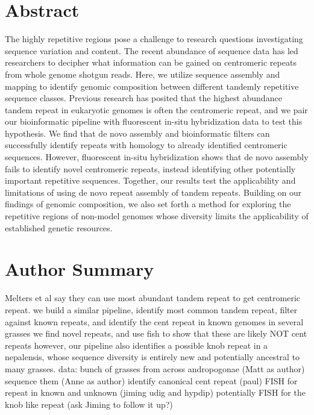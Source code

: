 \documentclass[10pt,letterpaper]{article}
\begin{document}
\section*{Abstract}
The highly repetitive regions pose a challenge to research questions investigating sequence variation and content.
The recent abundance of sequence data has led researchers to decipher what information can be gained on centromeric repeats from whole genome shotgun reads.
Here, we utilize sequence assembly and mapping to identify genomic composition between different tandemly repetitive sequence classes.
Previous research has posited that the highest abundance tandem repeat in eukaryotic genomes is often the centromeric repeat, and we pair our bioinformatic pipeline with fluorescent in-situ hybridization data to test this hypothesis.
We find that de novo assembly and bioinformatic filters can successfully identify repeats with homology to already identified centromeric sequences.
However, fluorescent in-situ hybridization shows that de novo assembly fails to identify novel centromeric repeats, instead identifying other potentially important repetitive sequences.
Together, our results test the applicability and limitations of using de novo repeat assembly of tandem repeats.
Building on our findings of genomic composition, we also set forth a method for exploring the repetitive regions of non-model genomes whose diversity limits the applicability of established genetic resources.


\section*{Author Summary}
Melters et al say they can use most abundant tandem repeat to get centromeric repeat.
we build a similar pipeline, identify most common tandem repeat, filter against known repeats, and identify the cent repeat in known genomes
in several grasses we find novel repeats, and use fish to show that these are likely NOT cent repeats
however, our pipeline also identifies a possible knob repeat in a nepalensis, whose sequence diversity is entirely new and potentially ancestral to many grasses.
data: 
bunch of grasses from across andropogonae (Matt as author)
sequence them (Anne as author)
identify canonical cent repeat (paul)
FISH for repeat in known and unknown (jiming udig and hypdip)
potentially FISH for the knob like repeat (ask Jiming to follow it up?)
\end{document}
